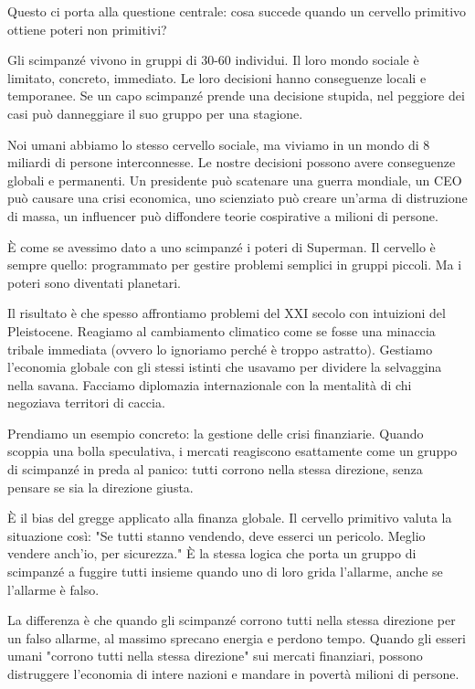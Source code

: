 \bigskip

Questo ci porta alla questione centrale: cosa succede quando un cervello primitivo ottiene poteri non primitivi?

Gli scimpanzé vivono in gruppi di 30-60 individui. Il loro mondo sociale è limitato, concreto, immediato. Le loro decisioni hanno conseguenze locali e temporanee. Se un capo scimpanzé prende una decisione stupida, nel peggiore dei casi può danneggiare il suo gruppo per una stagione.

Noi umani abbiamo lo stesso cervello sociale, ma viviamo in un mondo di 8 miliardi di persone interconnesse. Le nostre decisioni possono avere conseguenze globali e permanenti. Un presidente può scatenare una guerra mondiale, un CEO può causare una crisi economica, uno scienziato può creare un'arma di distruzione di massa, un influencer può diffondere teorie cospirative a milioni di persone.

È come se avessimo dato a uno scimpanzé i poteri di Superman. Il cervello è sempre quello: programmato per gestire problemi semplici in gruppi piccoli. Ma i poteri sono diventati planetari.

Il risultato è che spesso affrontiamo problemi del XXI secolo con intuizioni del Pleistocene. Reagiamo al cambiamento climatico come se fosse una minaccia tribale immediata (ovvero lo ignoriamo perché è troppo astratto). Gestiamo l'economia globale con gli stessi istinti che usavamo per dividere la selvaggina nella savana. Facciamo diplomazia internazionale con la mentalità di chi negoziava territori di caccia.

\medskip

Prendiamo un esempio concreto: la gestione delle crisi finanziarie. Quando scoppia una bolla speculativa, i mercati reagiscono esattamente come un gruppo di scimpanzé in preda al panico: tutti corrono nella stessa direzione, senza pensare se sia la direzione giusta.

È il bias del gregge applicato alla finanza globale. Il cervello primitivo valuta la situazione così: "Se tutti stanno vendendo, deve esserci un pericolo. Meglio vendere anch'io, per sicurezza." È la stessa logica che porta un gruppo di scimpanzé a fuggire tutti insieme quando uno di loro grida l'allarme, anche se l'allarme è falso.

La differenza è che quando gli scimpanzé corrono tutti nella stessa direzione per un falso allarme, al massimo sprecano energia e perdono tempo. Quando gli esseri umani "corrono tutti nella stessa direzione" sui mercati finanziari, possono distruggere l'economia di intere nazioni e mandare in povertà milioni di persone.

